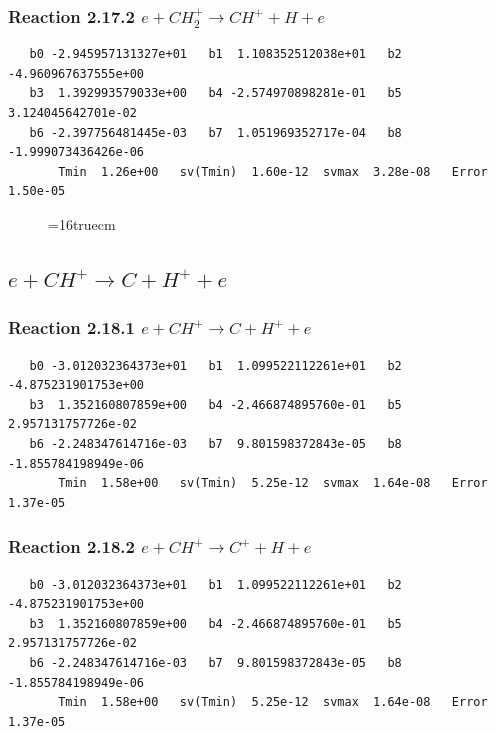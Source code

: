\documentclass[12pt,dvipdfmx]{article}
\begin{document}
\subsubsection{
Reaction 2.17.2   $e + CH_2^+ \rightarrow CH^+ + H + e $
}

\begin{small}\begin{verbatim}
   b0 -2.945957131327e+01   b1  1.108352512038e+01   b2 -4.960967637555e+00
   b3  1.392993579033e+00   b4 -2.574970898281e-01   b5  3.124045642701e-02
   b6 -2.397756481445e-03   b7  1.051969352717e-04   b8 -1.999073436426e-06
       Tmin  1.26e+00   sv(Tmin)  1.60e-12  svmax  3.28e-08   Error  1.50e-05
\end{verbatim}\end{small}

\begin{figure} \label{met.2_2.17}
\epsfxsize=16truecm
\end{figure}
\newpage

\subsection{
$e + CH^+ \rightarrow C + H^+ + e $
}

\subsubsection{
Reaction 2.18.1   $e + CH^+ \rightarrow C + H^+ + e $
}

\begin{small}\begin{verbatim}
   b0 -3.012032364373e+01   b1  1.099522112261e+01   b2 -4.875231901753e+00
   b3  1.352160807859e+00   b4 -2.466874895760e-01   b5  2.957131757726e-02
   b6 -2.248347614716e-03   b7  9.801598372843e-05   b8 -1.855784198949e-06
       Tmin  1.58e+00   sv(Tmin)  5.25e-12  svmax  1.64e-08   Error  1.37e-05
\end{verbatim}\end{small}

\subsubsection{
Reaction 2.18.2   $e + CH^+ \rightarrow C^+ + H + e $
}

\begin{small}\begin{verbatim}
   b0 -3.012032364373e+01   b1  1.099522112261e+01   b2 -4.875231901753e+00
   b3  1.352160807859e+00   b4 -2.466874895760e-01   b5  2.957131757726e-02
   b6 -2.248347614716e-03   b7  9.801598372843e-05   b8 -1.855784198949e-06
       Tmin  1.58e+00   sv(Tmin)  5.25e-12  svmax  1.64e-08   Error  1.37e-05
\end{verbatim}\end{small}
\end{document}
